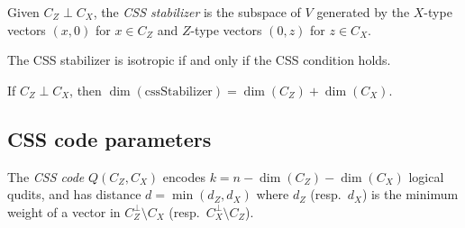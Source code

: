 \begin{definition}
\notready
Given $C_Z \perp C_X$, the \emph{CSS stabilizer} is the subspace of $V$ generated
by the $X$-type vectors $(x,0)$ for $x \in C_Z$ and $Z$-type vectors $(0,z)$ for $z \in C_X$.
\end{definition}

\begin{theorem}
\notready
The CSS stabilizer is isotropic if and only if the CSS condition holds.
\end{theorem}

\begin{theorem}
\notready
If $C_Z \perp C_X$, then $\dim(\mathrm{cssStabilizer}) = \dim(C_Z) + \dim(C_X)$.
\end{theorem}

\subsection{CSS code parameters}

\begin{definition}
\notready
The \emph{CSS code} $Q(C_Z, C_X)$ encodes
$k = n - \dim(C_Z) - \dim(C_X)$ logical qudits, and has distance
$d = \min(d_Z, d_X)$ where $d_Z$ (resp.\ $d_X$) is the minimum weight of a vector
in $C_Z^\perp \setminus C_X$ (resp.\ $C_X^\perp \setminus C_Z$).
\end{definition}
